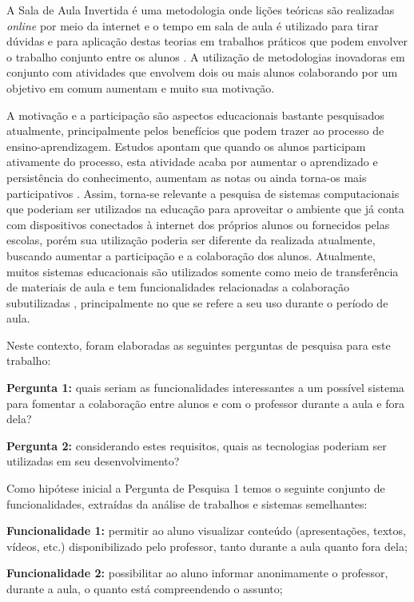 A Sala de Aula Invertida é uma metodologia onde lições teóricas são realizadas \emph{online} por meio da internet e o tempo em sala de aula é utilizado para tirar dúvidas e para aplicação destas teorias em trabalhos práticos que podem envolver o trabalho conjunto entre os alunos \cite{staker_classifying_2012}. A utilização de metodologias inovadoras em conjunto com atividades que envolvem dois ou mais alunos colaborando por um objetivo em comum aumentam e muito sua motivação.

A motivação e a participação são aspectos educacionais bastante pesquisados atualmente, principalmente pelos benefícios que podem trazer ao processo de ensino-aprendizagem. Estudos apontam que quando os alunos participam ativamente do processo, esta atividade acaba por aumentar o aprendizado e persistência do conhecimento, aumentam as notas ou ainda torna-os mais participativos \cite{felder1992quick}. Assim, torna-se relevante a pesquisa de sistemas computacionais que poderiam ser utilizados na educação para aproveitar o ambiente que já conta com dispositivos conectados à internet dos próprios alunos ou fornecidos pelas escolas, porém sua utilização poderia ser diferente da realizada atualmente, buscando aumentar a participação e a colaboração dos alunos. Atualmente, muitos sistemas educacionais são utilizados somente como meio de transferência de materiais de aula e tem funcionalidades relacionadas a colaboração subutilizadas \cite{takeda_percepcao_2013}, principalmente no que se refere a seu uso durante o período de aula.

Neste contexto, foram elaboradas as seguintes perguntas de pesquisa para este trabalho:

\textbf{Pergunta 1:} quais seriam as funcionalidades interessantes a um possível sistema para fomentar a colaboração entre alunos e com o professor durante a aula e fora dela?

\textbf{Pergunta 2:} considerando estes requisitos, quais as tecnologias poderiam ser utilizadas em seu desenvolvimento?

Como hipótese inicial a Pergunta de Pesquisa 1 temos o seguinte conjunto de funcionalidades, extraídas da análise de trabalhos e sistemas semelhantes:

\textbf{Funcionalidade 1:} permitir ao aluno visualizar conteúdo (apresentações, textos, vídeos, etc.) disponibilizado pelo professor, tanto durante a aula quanto fora dela;

\textbf{Funcionalidade 2:} possibilitar ao aluno informar anonimamente o professor, durante a aula, o quanto está compreendendo o assunto;

